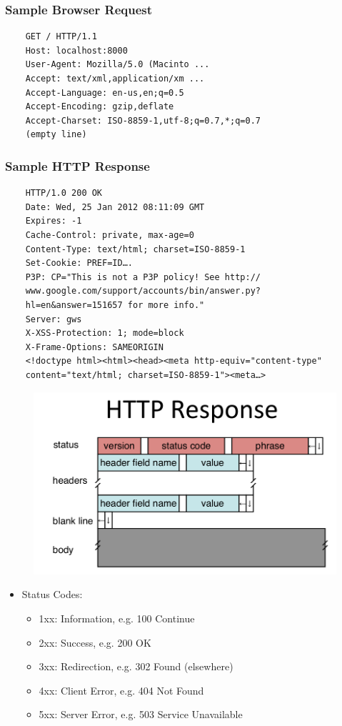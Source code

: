 \subsubsection{Sample Browser Request}
\begin{verbatim}
    GET / HTTP/1.1
    Host: localhost:8000
    User-Agent: Mozilla/5.0 (Macinto ...
    Accept: text/xml,application/xm ...
    Accept-Language: en-us,en;q=0.5
    Accept-Encoding: gzip,deflate
    Accept-Charset: ISO-8859-1,utf-8;q=0.7,*;q=0.7
    (empty line)
\end{verbatim}

\subsubsection{Sample HTTP Response}
\begin{verbatim}
    HTTP/1.0 200 OK
    Date: Wed, 25 Jan 2012 08:11:09 GMT
    Expires: -1
    Cache-Control: private, max-age=0
    Content-Type: text/html; charset=ISO-8859-1
    Set-Cookie: PREF=ID….
    P3P: CP="This is not a P3P policy! See http://
    www.google.com/support/accounts/bin/answer.py?
    hl=en&answer=151657 for more info."
    Server: gws
    X-XSS-Protection: 1; mode=block
    X-Frame-Options: SAMEORIGIN
    <!doctype html><html><head><meta http-equiv="content-type"
    content="text/html; charset=ISO-8859-1"><meta…>
\end{verbatim}
\begin{figure}[H]
    \includegraphics[width=\textwidth]{lazy/httpresponse.png}
\end{figure}
\begin{itemize}[nosep]
    \item Status Codes:
          \begin{itemize}[nosep]
              \item 1xx: Information, e.g. 100 Continue
              \item 2xx: Success, e.g. 200 OK
              \item 3xx: Redirection, e.g. 302 Found (elsewhere)
              \item 4xx: Client Error, e.g. 404 Not Found
              \item 5xx: Server Error, e.g. 503 Service Unavailable
          \end{itemize}
\end{itemize}
